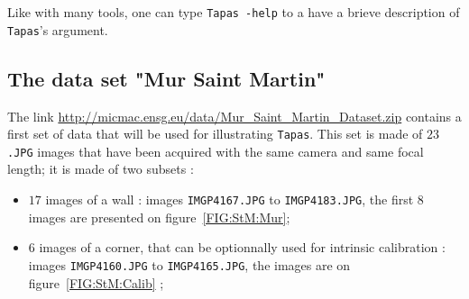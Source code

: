 Like with many tools, one can type {\tt Tapas -help} to a have a brieve description
of {\tt Tapas}'s argument.


\subsection{The data set  "Mur Saint Martin"}



The link \url{http://micmac.ensg.eu/data/Mur_Saint_Martin_Dataset.zip} contains
a first set of data that will be used for illustrating {\tt Tapas}.
This set is made of $23$ {\tt .JPG} images that have been acquired with the same
camera and same focal length; it is made of two subsets :

\begin{itemize}
    \item $17$ images of a wall : images {\tt IMGP4167.JPG} to {\tt IMGP4183.JPG}, the first
	  $8$ images are presented on figure~\ref{FIG:StM:Mur};
    \item $6$ images of a corner, that can be optionnally used for intrinsic calibration
	   : images {\tt IMGP4160.JPG} to {\tt IMGP4165.JPG}, the images are on figure~\ref{FIG:StM:Calib} ;
\end{itemize}



